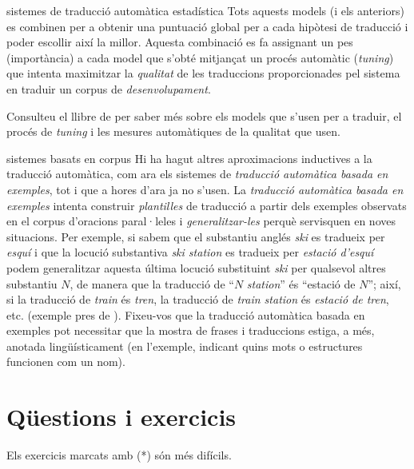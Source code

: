 \begin{persabermes}{sistemes de traducció automàtica estadística}
  Tots aquests models (i els anteriors) es combinen per a obtenir una
  puntuació global per a cada hipòtesi de traducció i poder escollir
  així la millor. Aquesta combinació es fa assignant un pes
  (importància) a cada model que s'obté mitjançat un procés automàtic
  (\emph{tuning}) que intenta maximitzar la \emph{qualitat} de les
  traduccions proporcionades pel sistema en traduir un corpus de
  \emph{desenvolupament}.  

  Consulteu el llibre de \citet{koehnbook} per saber més sobre els
  models que s'usen per a traduir, el procés de \emph{tuning} i les
  mesures automàtiques de la qualitat que usen.
\end{persabermes}


\begin{persabermes}{sistemes basats en corpus}
  Hi ha hagut altres aproximacions inductives a la traducció
  automàtica, com ara els sistemes de \emph{traducció automàtica
    basada en exemples}, tot i que a hores d'ara ja no s'usen.  La
  \emph{traducció automàtica basada en exemples} intenta construir
  \emph{plantilles} de traducció a partir dels exemples observats en
  el corpus d'oracions paral·leles i \emph{generalitzar-les} perquè
  servisquen en noves situacions. Per exemple, si sabem que el
  substantiu anglés \emph{ski} es tradueix per \emph{esquí} i que la
  locució substantiva \emph{ski station} es tradueix per \emph{estació
    d'esquí} podem generalitzar aquesta última locució substituint
  \emph{ski} per qualsevol altres substantiu $N$, de manera que la
  traducció de ``$N$ \emph{station}'' és ``estació de $N$''; així, si
  la traducció de \emph{train} és \emph{tren}, la traducció de
  \emph{train station} és \emph{estació de tren}, etc. (exemple pres
  de \citealt{carl01j}). Fixeu-vos que la traducció automàtica basada
  en exemples pot necessitar que la mostra de frases i traduccions
  estiga, a més, anotada lingüísticament (en l'exemple, indicant quins
  mots o estructures funcionen com un nom).
\end{persabermes}


\section{Qüestions i exercicis}
Els exercicis marcats amb (*) són més difícils.

